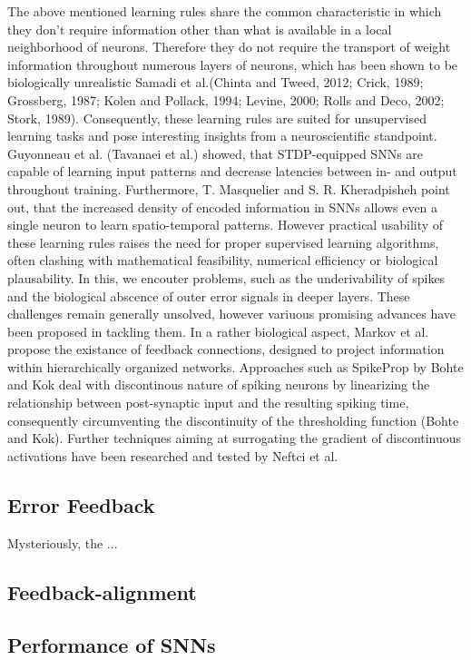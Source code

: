 \documentclass[letterpaper, 10 pt, conference]{ieeeconf}  %
\begin{document}
The above mentioned learning rules share the common characteristic in which they don't require information other than what is available 
in a local neighborhood of neurons. Therefore they do not require the transport of weight information throughout numerous layers of neurons, which
has been shown to be biologically unrealistic Samadi et al.(Chinta and Tweed, 2012; Crick, 1989; Grossberg, 1987; Kolen and Pollack, 1994; Levine, 
2000; Rolls and Deco, 2002; Stork, 1989). Consequently, these learning rules are suited for unsupervised learning tasks and pose interesting 
insights from a neuroscientific standpoint. Guyonneau et al. (Tavanaei et al.) showed, that STDP-equipped SNNs are capable of learning input 
patterns and decrease latencies between in- and output throughout training. Furthermore, T. Masquelier and S. R. Kheradpisheh point out, that 
the increased density of encoded information in SNNs allows even a single neuron to learn spatio-temporal patterns. However practical usability
of these learning rules raises the need for proper supervised learning algorithms, often clashing with mathematical feasibility, numerical efficiency 
or biological plausability. In this, we encouter problems, such as the underivability of spikes and the biological abscence of outer error 
signals in deeper layers. These challenges remain generally unsolved, however variuous promising advances have been proposed in tackling them.
In a rather biological aspect, Markov et al. propose the existance of feedback connections, designed to project information within
hierarchically organized networks. Approaches such as SpikeProp by Bohte and Kok deal with discontinous nature of spiking neurons by linearizing 
the relationship between post-synaptic input and the resulting spiking time, consequently circumventing the discontinuity of the 
thresholding function (Bohte and Kok). Further techniques aiming at surrogating the gradient of discontinuous activations have been researched 
and tested by Neftci et al.

\subsection{Error Feedback}
Mysteriously, the ...

\subsection{Feedback-alignment}


\subsection{Performance of SNNs}
\end{document}
